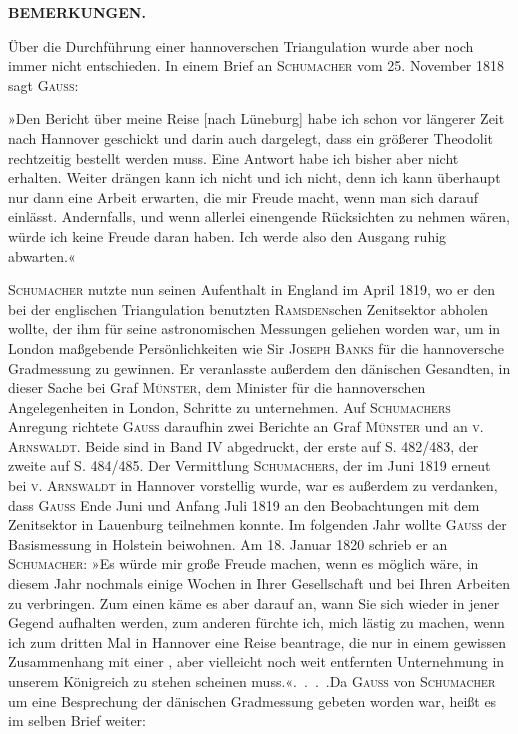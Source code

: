 \par\clearpage
\noindent{}\hfill\textbf{BEMERKUNGEN.}\hfill\null\par\medskip
\par\noindent\hspace*{\parindent}Über die Durchführung einer hannoverschen Triangulation wurde aber noch immer nicht entschieden. In einem Brief an \textsc{Schumacher} vom 25. November 1818 sagt \textsc{Gauss}:

\par\noindent\hspace*{\parindent}»Den Bericht über meine Reise [nach Lüneburg] habe ich schon vor längerer Zeit nach Hannover geschickt und darin auch dargelegt, dass ein größerer Theodolit rechtzeitig bestellt werden muss. Eine Antwort habe ich bisher aber nicht erhalten. Weiter drängen kann ich nicht und  ich nicht, denn ich kann überhaupt nur dann eine Arbeit erwarten, die mir Freude macht, wenn man sich  darauf einlässt. Andernfalls, und wenn allerlei einengende Rücksichten zu nehmen wären, würde ich keine Freude daran haben. Ich werde also den Ausgang ruhig abwarten.«

\par\noindent\hspace*{\parindent}\textsc{Schumacher} nutzte nun seinen Aufenthalt in England im April 1819, wo er den bei der englischen Triangulation benutzten \textsc{Ramsden}schen Zenitsektor abholen wollte, der ihm für seine astronomischen Messungen geliehen worden war, um in London maßgebende Persönlichkeiten wie Sir \textsc{Joseph Banks} für die hannoversche Gradmessung zu gewinnen. Er veranlasste außerdem den dänischen Gesandten, in dieser Sache bei Graf \textsc{Münster}, dem Minister für die hannoverschen Angelegenheiten in London, Schritte zu unternehmen. Auf \textsc{Schumachers} Anregung richtete \textsc{Gauss} daraufhin zwei Berichte an Graf \textsc{Münster} und an \textsc{v. Arnswaldt}. Beide sind in Band IV abgedruckt, der erste auf S. 482/483, der zweite auf S. 484/485. Der Vermittlung \textsc{Schumachers}, der im Juni 1819 erneut bei \textsc{v. Arnswaldt} in Hannover vorstellig wurde, war es außerdem zu verdanken, dass \textsc{Gauss} Ende Juni und Anfang Juli 1819 an den Beobachtungen mit dem Zenitsektor in Lauenburg teilnehmen konnte. Im folgenden Jahr wollte \textsc{Gauss} der Basismessung in Holstein beiwohnen. Am 18. Januar 1820 schrieb er an \textsc{Schumacher}: »Es würde mir große Freude machen, wenn es möglich wäre, in diesem Jahr nochmals einige Wochen in Ihrer Gesellschaft und bei Ihren Arbeiten zu verbringen. Zum einen käme es aber darauf an, wann Sie sich wieder in jener Gegend aufhalten werden, zum anderen fürchte ich, mich lästig zu machen, wenn ich zum dritten Mal in Hannover eine Reise beantrage, die nur in einem gewissen Zusammenhang mit einer , aber vielleicht noch weit entfernten Unternehmung in unserem Königreich zu stehen scheinen muss.«\enspace .\ .\ .\ .\enspace Da \textsc{Gauss} von \textsc{Schumacher} um eine Besprechung der dänischen Gradmessung gebeten worden war, heißt es im selben Brief weiter:

